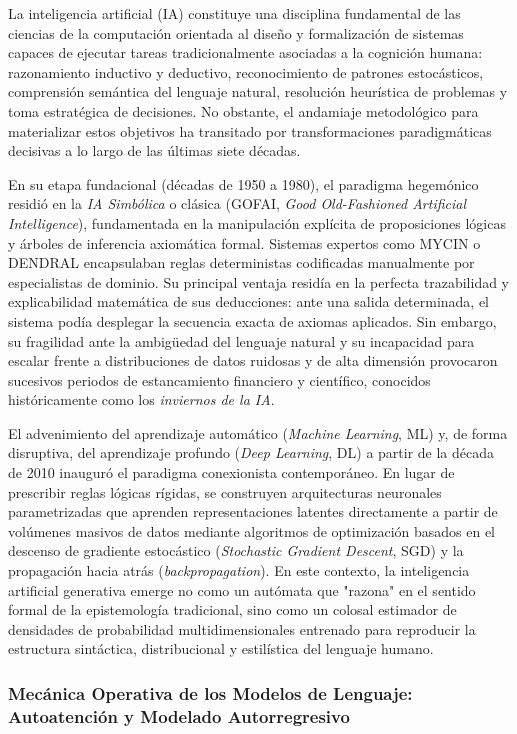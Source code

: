 La inteligencia artificial (IA) constituye una disciplina fundamental de las ciencias de la computación orientada al diseño y formalización de sistemas capaces de ejecutar tareas tradicionalmente asociadas a la cognición humana: razonamiento inductivo y deductivo, reconocimiento de patrones estocásticos, comprensión semántica del lenguaje natural, resolución heurística de problemas y toma estratégica de decisiones. No obstante, el andamiaje metodológico para materializar estos objetivos ha transitado por transformaciones paradigmáticas decisivas a lo largo de las últimas siete décadas.

En su etapa fundacional (décadas de 1950 a 1980), el paradigma hegemónico residió en la \textit{IA Simbólica} o clásica (GOFAI, \textit{Good Old-Fashioned Artificial Intelligence}), fundamentada en la manipulación explícita de proposiciones lógicas y árboles de inferencia axiomática formal. Sistemas expertos como MYCIN o DENDRAL encapsulaban reglas deterministas codificadas manualmente por especialistas de dominio. Su principal ventaja residía en la perfecta trazabilidad y explicabilidad matemática de sus deducciones: ante una salida determinada, el sistema podía desplegar la secuencia exacta de axiomas aplicados. Sin embargo, su fragilidad ante la ambigüedad del lenguaje natural y su incapacidad para escalar frente a distribuciones de datos ruidosas y de alta dimensión provocaron sucesivos periodos de estancamiento financiero y científico, conocidos históricamente como los \textit{inviernos de la IA}.

El advenimiento del aprendizaje automático (\textit{Machine Learning}, ML) y, de forma disruptiva, del aprendizaje profundo (\textit{Deep Learning}, DL) a partir de la década de 2010 inauguró el paradigma conexionista contemporáneo. En lugar de prescribir reglas lógicas rígidas, se construyen arquitecturas neuronales parametrizadas que aprenden representaciones latentes directamente a partir de volúmenes masivos de datos mediante algoritmos de optimización basados en el descenso de gradiente estocástico (\textit{Stochastic Gradient Descent}, SGD) y la propagación hacia atrás (\textit{backpropagation}). En este contexto, la inteligencia artificial generativa emerge no como un autómata que "razona" en el sentido formal de la epistemología tradicional, sino como un colosal estimador de densidades de probabilidad multidimensionales entrenado para reproducir la estructura sintáctica, distribucional y estilística del lenguaje humano.

\subsubsection{Mecánica Operativa de los Modelos de Lenguaje: Autoatención y Modelado Autorregresivo}

